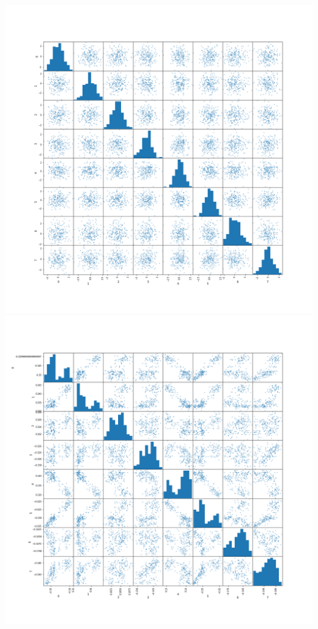 \documentclass{article}
\begin{document}
\begin{center}

\includegraphics[width=\linewidth]{200_10_0_8_0.png}
\includegraphics[width=\linewidth]{200_10_0_8_10.png}

\end{center}
\end{document}
